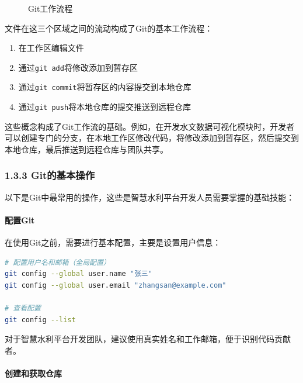 \begin{figure}
\centering

\caption{Git工作流程}
\end{figure}

文件在这三个区域之间的流动构成了Git的基本工作流程：

\begin{enumerate}
\def\labelenumi{\arabic{enumi}.}
\tightlist
\item
  在工作区编辑文件
\item
  通过\passthrough{\lstinline!git add!}将修改添加到暂存区
\item
  通过\passthrough{\lstinline!git commit!}将暂存区的内容提交到本地仓库
\item
  通过\passthrough{\lstinline!git push!}将本地仓库的提交推送到远程仓库
\end{enumerate}

这些概念构成了Git工作流的基础。例如，在开发水文数据可视化模块时，开发者可以创建专门的分支，在本地工作区修改代码，将修改添加到暂存区，然后提交到本地仓库，最后推送到远程仓库与团队共享。

\subsubsection{1.3.3
Git的基本操作}\label{gitux7684ux57faux672cux64cdux4f5c}

以下是Git中最常用的操作，这些是智慧水利平台开发人员需要掌握的基础技能：

\paragraph{配置Git}\label{ux914dux7f6egit}

在使用Git之前，需要进行基本配置，主要是设置用户信息：

\begin{lstlisting}[language=bash]
# 配置用户名和邮箱（全局配置）
git config --global user.name "张三"
git config --global user.email "zhangsan@example.com"

# 查看配置
git config --list
\end{lstlisting}

对于智慧水利平台开发团队，建议使用真实姓名和工作邮箱，便于识别代码贡献者。

\paragraph{创建和获取仓库}\label{ux521bux5efaux548cux83b7ux53d6ux4ed3ux5e93}


